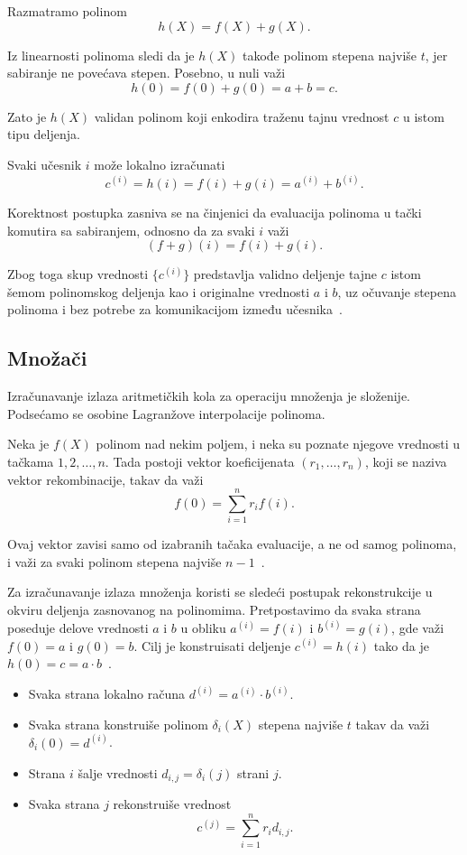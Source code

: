 Razmatramo polinom
\[
h(X) = f(X) + g(X).
\]

Iz linearnosti polinoma sledi da je $h(X)$ takođe polinom stepena najviše $t$, jer sabiranje ne povećava stepen. Posebno, u nuli važi
\[
h(0) = f(0) + g(0) = a + b = c.
\]

Zato je $h(X)$ validan polinom koji enkodira traženu tajnu vrednost $c$ u istom tipu deljenja.

Svaki učesnik $i$ može lokalno izračunati
\[
c^{(i)} = h(i) = f(i) + g(i) = a^{(i)} + b^{(i)}.
\]

Korektnost postupka zasniva se na činjenici da evaluacija polinoma u tački komutira sa sabiranjem, odnosno da za svaki $i$ važi
\[
(f+g)(i) = f(i) + g(i).
\]

Zbog toga skup vrednosti $\{c^{(i)}\}$ predstavlja validno deljenje tajne $c$ istom šemom polinomskog deljenja kao i originalne vrednosti $a$ i $b$, uz očuvanje stepena polinoma i bez potrebe za komunikacijom između učesnika~\cite{smart2016cryptography}.

\subsection{Množači}

Izračunavanje izlaza aritmetičkih kola za operaciju množenja je složenije. Podsećamo se osobine Lagranžove interpolacije polinoma.

Neka je $f(X)$ polinom nad nekim poljem, i neka su poznate njegove vrednosti u tačkama $1,2,\ldots,n$. Tada postoji vektor koeficijenata $(r_1,\ldots,r_n)$, koji se naziva vektor rekombinacije, takav da važi
\[
f(0) = \sum_{i=1}^n r_i f(i).
\]

Ovaj vektor zavisi samo od izabranih tačaka evaluacije, a ne od samog polinoma, i važi za svaki polinom stepena najviše $n-1$~\cite{smart2016cryptography}.

Za izračunavanje izlaza množenja koristi se sledeći postupak rekonstrukcije u okviru deljenja zasnovanog na polinomima. Pretpostavimo da svaka strana poseduje delove vrednosti $a$ i $b$ u obliku $a^{(i)} = f(i)$ i $b^{(i)} = g(i)$, gde važi $f(0)=a$ i $g(0)=b$. Cilj je konstruisati deljenje $c^{(i)} = h(i)$ tako da je $h(0)=c=a\cdot b$~\cite{smart2016cryptography}.

\begin{itemize}
    \item Svaka strana lokalno računa $d^{(i)} = a^{(i)} \cdot b^{(i)}$.
    \item Svaka strana konstruiše polinom $\delta_i(X)$ stepena najviše $t$ takav da važi $\delta_i(0)=d^{(i)}$.
    \item Strana $i$ šalje vrednosti $d_{i,j} = \delta_i(j)$ strani $j$.
    \item Svaka strana $j$ rekonstruiše vrednost
    \[
    c^{(j)} = \sum_{i=1}^n r_i d_{i,j}.
    \]
\end{itemize}

